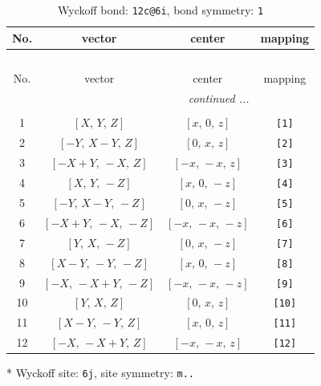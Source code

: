 \documentclass[fleqn,8pt]{jsarticle}
\begin{document}
\begin{longtable}{cccc}
\caption{Wyckoff bond: {\tt 12c@6i}, bond symmetry: {\tt 1}}
 \\
 \hline \hline
No. & vector & center & mapping \\ \hline \endfirsthead

\multicolumn{3}{l}{\tablename\ \thetable{}} \\
 \hline \hline
No. & vector & center & mapping \\ \hline \endhead

 \hline \hline
\multicolumn{3}{r}{\footnotesize\it continued ...} \\ \endfoot

 \hline \hline
\multicolumn{3}{r}{} \\ \endlastfoot

1 & $\left[ X,\, Y,\, Z \right]$ & $\left[ x,\, 0,\, z \right]$ & {\tt [1]} \\ \hline
2 & $\left[ - Y,\, X - Y,\, Z \right]$ & $\left[ 0,\, x,\, z \right]$ & {\tt [2]} \\ \hline
3 & $\left[ - X + Y,\, - X,\, Z \right]$ & $\left[ - x,\, - x,\, z \right]$ & {\tt [3]} \\ \hline
4 & $\left[ X,\, Y,\, - Z \right]$ & $\left[ x,\, 0,\, - z \right]$ & {\tt [4]} \\ \hline
5 & $\left[ - Y,\, X - Y,\, - Z \right]$ & $\left[ 0,\, x,\, - z \right]$ & {\tt [5]} \\ \hline
6 & $\left[ - X + Y,\, - X,\, - Z \right]$ & $\left[ - x,\, - x,\, - z \right]$ & {\tt [6]} \\ \hline
7 & $\left[ Y,\, X,\, - Z \right]$ & $\left[ 0,\, x,\, - z \right]$ & {\tt [7]} \\ \hline
8 & $\left[ X - Y,\, - Y,\, - Z \right]$ & $\left[ x,\, 0,\, - z \right]$ & {\tt [8]} \\ \hline
9 & $\left[ - X,\, - X + Y,\, - Z \right]$ & $\left[ - x,\, - x,\, - z \right]$ & {\tt [9]} \\ \hline
10 & $\left[ Y,\, X,\, Z \right]$ & $\left[ 0,\, x,\, z \right]$ & {\tt [10]} \\ \hline
11 & $\left[ X - Y,\, - Y,\, Z \right]$ & $\left[ x,\, 0,\, z \right]$ & {\tt [11]} \\ \hline
12 & $\left[ - X,\, - X + Y,\, Z \right]$ & $\left[ - x,\, - x,\, z \right]$ & {\tt [12]} \\
\end{longtable}
* Wyckoff site: {\tt 6j}, site symmetry: {\tt m..}
\renewcommand{\arraystretch}{1.2}
\end{document}
